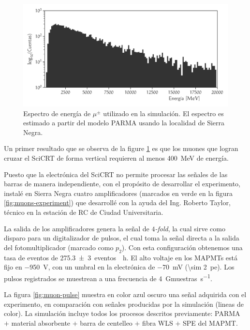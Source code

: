 \begin{figure}
        \centering
        \includegraphics[width=\textwidth]{scibar-edep.pdf}
        \caption{Espectro de energía de $\mu^{\pm}$ utilizado en la simulación. El espectro es estimado a partir del modelo PARMA usando la localidad de Sierra Negra.}
        \label{fig:muons-spectrum}
\end{figure}

Un primer resultado que se observa de la figure \ref{fig:muons-spectrum} es que los muones que logran cruzar el SciCRT de forma vertical requieren al menos \SI{400}{\mega\electronvolt} de energía.

Puesto que la electrónica del SciCRT no permite procesar las señales de las barras de manera independiente, con el propósito de desarrollar el experimento, instalé en Sierra Negra cuatro amplificadores (marcados en verde en la figura \ref{fig:muons-experiment}) que desarrollé con la ayuda del Ing. Roberto Taylor, técnico en la estación de RC de Ciudad Universitaria.

La salida de los amplificadores genera la señal de \emph{$4$-fold}, la cual sirve como disparo para un digitalizador de pulsos, el cual toma la señal directa a la salida del fotomultiplicador (marcado como $p_{2}$). Con esta configuración obtenemos una tasa de eventos de \SI{275.3(30)}{eventos \per\hour}. El alto voltaje en los MAPMTs está fijo en \SI{-950}{\volt}, con un umbral en la electrónica de \SI{-70}{\milli\volt} (\SI{\sim 2}{pe}). Los pulsos registrados se muestrean a una frecuencia de \SI{4}{\giga muestras\per\second}.

La figura \ref{fig:muon-pulse} muestra en color azul oscuro una señal adquirida con el experimento, en comparación con señales producidas por la simulación (lineas de color). La simulación incluye todos los procesos descritos previamente: PARMA $+$ material absorbente $+$ barra de centelleo $+$ fibra WLS $+$ SPE del MAPMT.

